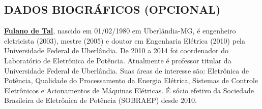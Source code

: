 \documentclass{ceel}
\begin{document}
\begin{multicols}{2}
\section*{DADOS BIOGRÁFICOS (OPCIONAL)}
\noindent \underline{\textbf{Fulano de Tal}}, nascido em 01/02/1980 em Uberlândia-MG, é engenheiro eletricista (2003), mestre (2005) e doutor em Engenharia Elétrica (2010) pela Universidade Federal de Uberlândia. De 2010 a 2014 foi coordenador do Laboratório de Eletrônica de Potência. Atualmente é professor titular da Universidade Federal de Uberlândia. Suas áreas de interesse são: Eletrônica de Potência, Qualidade do Processamento da Energia Elétrica, Sistemas de Controle Eletrônicos e Acionamentos de Máquinas Elétricas. É sócio efetivo da Sociedade Brasileira de Eletrônica de Potência (SOBRAEP) desde 2010.





\end{multicols}
\end{document}
